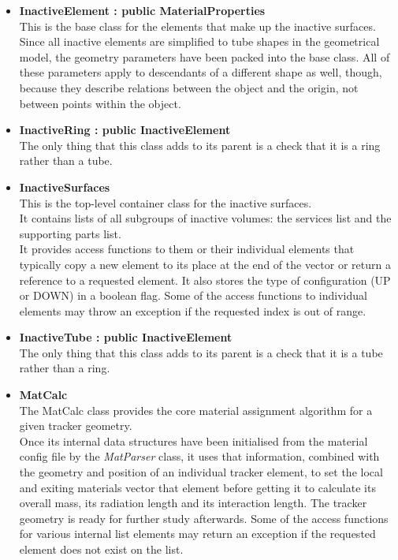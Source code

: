 \documentclass[12pt, a4paper]{article}
\begin{document}
\begin{itemize}
\item \textbf{InactiveElement : public MaterialProperties}\\
This is the base class for the elements that make up the inactive surfaces.\\
Since all inactive elements are simplified to tube shapes in the geometrical model, the geometry parameters have been packed into the base class. All of these parameters apply to descendants of a different shape as well, though, because they describe relations between the object and the origin, not between points within the object.

\item \textbf{InactiveRing : public InactiveElement}\\
The only thing that this class adds to its parent is a check that it is a ring rather than a tube.

\item \textbf{InactiveSurfaces}\\
This is the top-level container class  for the inactive surfaces.\\
It contains lists of all subgroups of inactive volumes: the services list and the supporting parts list.\\
It provides access functions to them or their individual elements that typically copy a new element to its place at the end of the vector or return a reference to a requested element. It also stores the type of configuration (UP or DOWN) in a boolean flag. Some of the access functions to individual elements may throw an exception if the requested index is out of range.

\item \textbf{InactiveTube : public InactiveElement}\\
The only thing that this class adds to its parent is a check that it is a tube rather than a ring.

\item \textbf{MatCalc}\\
The MatCalc class provides the core material assignment algorithm for a given tracker geometry.\\
Once its internal data structures have been initialised from the material config file by the \emph{MatParser} class, it uses that information, combined with the geometry and position of an individual tracker element, to set the local and exiting materials vector that element before getting it to calculate its overall mass, its radiation length and its interaction length. The tracker geometry is ready for further study afterwards. Some of the access functions for various internal list elements may return an exception if the requested element does not exist on the list.

\end{itemize}
\end{document}
